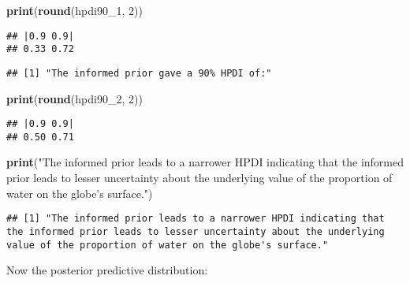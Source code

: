\documentclass[
]{book}
\newenvironment{Shaded}{\begin{snugshade}}{\end{snugshade}}
\newcommand{\DecValTok}[1]{\textcolor[rgb]{0.00,0.00,0.81}{#1}}
\newcommand{\KeywordTok}[1]{\textcolor[rgb]{0.13,0.29,0.53}{\textbf{#1}}}
\newcommand{\NormalTok}[1]{#1}
\newcommand{\StringTok}[1]{\textcolor[rgb]{0.31,0.60,0.02}{#1}}
\begin{document}
\begin{Shaded}
\begin{Highlighting}[]
\KeywordTok{print}\NormalTok{(}\KeywordTok{round}\NormalTok{(hpdi90_}\DecValTok{1}\NormalTok{, }\DecValTok{2}\NormalTok{))}
\end{Highlighting}
\end{Shaded}

\begin{verbatim}
## |0.9 0.9| 
## 0.33 0.72
\end{verbatim}

\begin{Shaded}
\end{Shaded}

\begin{verbatim}
## [1] "The informed prior gave a 90% HPDI of:"
\end{verbatim}

\begin{Shaded}
\begin{Highlighting}[]
\KeywordTok{print}\NormalTok{(}\KeywordTok{round}\NormalTok{(hpdi90_}\DecValTok{2}\NormalTok{, }\DecValTok{2}\NormalTok{))}
\end{Highlighting}
\end{Shaded}

\begin{verbatim}
## |0.9 0.9| 
## 0.50 0.71
\end{verbatim}

\begin{Shaded}
\begin{Highlighting}[]
\KeywordTok{print}\NormalTok{(}\StringTok{"The informed prior leads to a narrower HPDI indicating that the informed prior leads to lesser uncertainty about the underlying value of the proportion of water on the globe's surface."}\NormalTok{)}
\end{Highlighting}
\end{Shaded}

\begin{verbatim}
## [1] "The informed prior leads to a narrower HPDI indicating that the informed prior leads to lesser uncertainty about the underlying value of the proportion of water on the globe's surface."
\end{verbatim}

Now the posterior predictive distribution:
\end{document}
